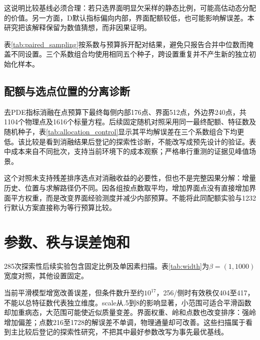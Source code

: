 这说明比较基线必须合理：若只选界面明显欠采样的静态比例，可能高估动态分配的价值。另一方面，D默认指标偏向内部，界面配额较低，也可能影响解误差。本研究把该解释保留为数值猜想，而非因果证明。

表\ref{tab:paired_sampling}按系数与预算拆开配对结果，避免只报告合并中位数而掩盖不同设置。三个系数组合均使用相同五个种子，跨设置重复并不产生新的独立初始化样本。
\begin{table}[p]\centering\caption{平滑模型的分设置配对；比值为D误差除以基线误差}\label{tab:paired_sampling}\end{table}

\subsection{配额与选点位置的分离诊断}
去PDE指标消融在点预算下最终每侧内部176点、界面512点，外边界240点，共1104个物理点及1616个标量方程。后续固定随机对照采用同一最终配额、特征数及随机种子，表\ref{tab:allocation_control}显示其平均解误差在三个系数组合下均更低。该比较是看到消融结果后登记的探索性诊断，不能改写成预先设计的验证。表中成本来自不同批次，支持当前环境下的成本观察；严格串行重测的证据见峰值场景。
\begin{table}[htbp]\centering\caption{相同最终配额的随机对照与去PDE指标消融，五种子}\label{tab:allocation_control}\resizebox{\textwidth}{!}{}\end{table}
这个对照未支持残差排序选点对消融收益的必要性，但也不是完整因果分解：增量历史、位置与求解路径仍不同。因各组按点数取平均，增加界面点没有直接增加界面平方权重，而是改变界面经验测度并减少内部预算。不能将此同配额实验与1232行默认方案直接称为等行预算比较。

\section{参数、秩与误差饱和}
285次探索性后续实验包含固定比例及单因素扫描。表\ref{tab:width}为$\beta=(1,1000)$宽度对照，其他设置固定。
\begin{table}[htbp]\centering\caption{特征宽度敏感性，数据秩上限为总特征数}\label{tab:width}\end{table}
当前平滑模型增宽改善误差，但条件数升至约$10^{17}$，256/侧时有效秩仅404至417，不能以总特征数代表独立维度。scale从.5到8的影响显著，小范围可适合平滑函数却加重病态，大范围可能使近似质量变差。界面权重、岭和点数也改变排序：强岭增加偏差；点数216至1728的解误差不单调，物理通量却可改善。这些扫描属于看到主比较后登记的探索性研究，不把其中最好参数改写为事先最优基线。

